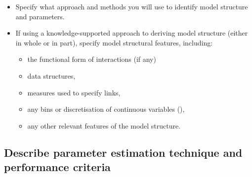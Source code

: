 \documentclass[
]{article}
\providecommand{\tightlist}{%
  \setlength{\itemsep}{0pt}\setlength{\parskip}{0pt}}
\begin{document}
\begin{tcolorbox}[enhanced jigsaw, opacitybacktitle=0.6, bottomrule=.15mm, leftrule=.75mm, rightrule=.15mm, colbacktitle=quarto-callout-caution-color!10!white, toprule=.15mm, titlerule=0mm, left=2mm, colframe=quarto-callout-caution-color-frame, breakable, title=\textcolor{quarto-callout-caution-color}{\faFire}\hspace{0.5em}{Preregistration Item}, opacityback=0, coltitle=black, bottomtitle=1mm, colback=white, toptitle=1mm, arc=.35mm]

\begin{itemize}
\tightlist
\item[$\square$]
  Specify what approach and methods you will use to identify model
  structure and parameters.
\item[$\square$]
  If using a knowledge-supported approach to deriving model structure
  (either in whole or in part), specify model structural features,
  including:

  \begin{itemize}
  \tightlist
  \item
    the functional form of interactions (if any)
  \item
    data structures,
  \item
    measures used to specify links,
  \item
    any bins or discretisation of continuous variables
    (),
  \item
    any other relevant features of the model structure.
  \end{itemize}
\end{itemize}

\end{tcolorbox}

\subsection{Describe parameter estimation technique and performance
criteria}\label{describe-parameter-estimation-technique-and-performance-criteria}
\end{document}
